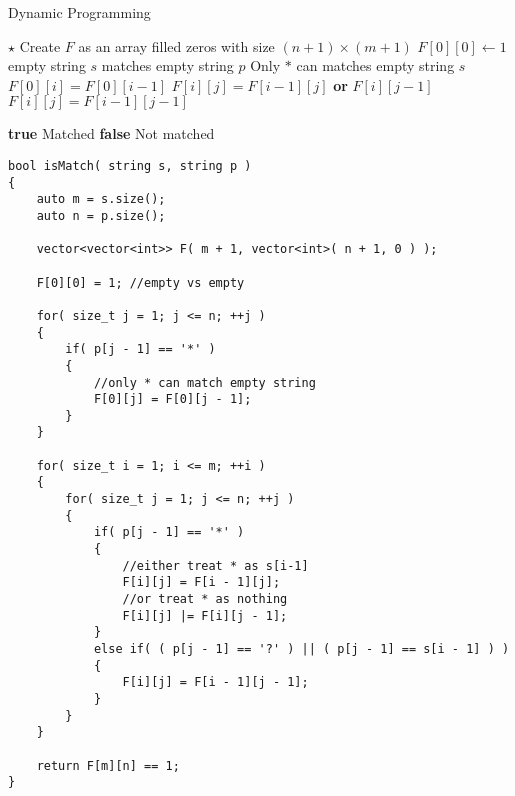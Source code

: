 \setcounter{algorithm}{0}
\begin{algorithm}[H]
\caption{Dynamic Programming}
\begin{algorithmic}[1]
\State $\star$ Create $F$ as an array filled zeros with size $(n+1)\times (m+1)$
\State $F[0][0]\gets 1$ \Comment empty string $s$ matches empty string $p$
 \Comment Only $\ast$ can matches empty string $s$
\State $F[0][i] = F[0][i-1]$
\EndIf
\EndFor
{}
\State $F[i][j] = F[i-1][j]$ \textbf{or} $F[i][j-1]$
\State $F[i][j] = F[i-1][j-1]$
\end{algorithmic}
\end{algorithm}
\begin{algorithm}[H]
\begin{algorithmic}[1]
\EndIf
\EndFor
\EndFor
{}
\State \Return \textbf{true} \Comment Matched
\Else
\State \Return \textbf{false} \Comment Not matched
\EndIf
\EndProcedure
\end{algorithmic}
\end{algorithm}

\setcounter{lstlisting}{0}
\begin{lstlisting}[style=customc, caption={Dynamic Programming}]
bool isMatch( string s, string p )
{
    auto m = s.size();
    auto n = p.size();

    vector<vector<int>> F( m + 1, vector<int>( n + 1, 0 ) );

    F[0][0] = 1; //empty vs empty

    for( size_t j = 1; j <= n; ++j )
    {
        if( p[j - 1] == '*' )
        {
            //only * can match empty string
            F[0][j] = F[0][j - 1];
        }
    }

    for( size_t i = 1; i <= m; ++i )
    {
        for( size_t j = 1; j <= n; ++j )
        {
            if( p[j - 1] == '*' )
            {
                //either treat * as s[i-1]
                F[i][j] = F[i - 1][j];
                //or treat * as nothing
                F[i][j] |= F[i][j - 1];
            }
            else if( ( p[j - 1] == '?' ) || ( p[j - 1] == s[i - 1] ) )
            {
                F[i][j] = F[i - 1][j - 1];
            }
        }
    }

    return F[m][n] == 1;
}
\end{lstlisting}